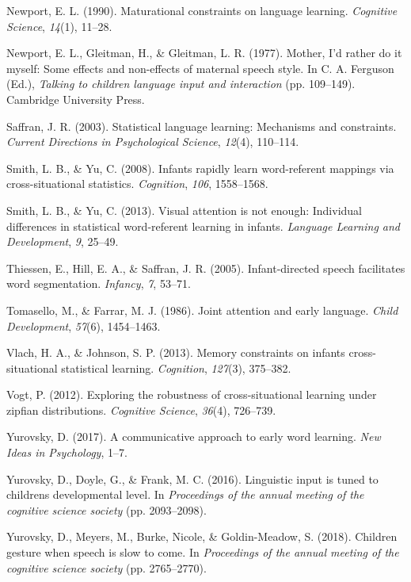 \documentclass[10pt, letterpaper]{article}
\begin{document}
\hypertarget{ref-newport1990}{}
Newport, E. L. (1990). Maturational constraints on language learning.
\emph{Cognitive Science}, \emph{14}(1), 11--28.

\hypertarget{ref-newport1977}{}
Newport, E. L., Gleitman, H., \& Gleitman, L. R. (1977). Mother, I'd
rather do it myself: Some effects and non-effects of maternal speech
style. In C. A. Ferguson (Ed.), \emph{Talking to children language input
and interaction} (pp. 109--149). Cambridge University Press.

\hypertarget{ref-saffran2003}{}
Saffran, J. R. (2003). Statistical language learning: Mechanisms and
constraints. \emph{Current Directions in Psychological Science},
\emph{12}(4), 110--114.

\hypertarget{ref-smith2008}{}
Smith, L. B., \& Yu, C. (2008). Infants rapidly learn word-referent
mappings via cross-situational statistics. \emph{Cognition}, \emph{106},
1558--1568.

\hypertarget{ref-smith2013}{}
Smith, L. B., \& Yu, C. (2013). Visual attention is not enough:
Individual differences in statistical word-referent learning in infants.
\emph{Language Learning and Development}, \emph{9}, 25--49.

\hypertarget{ref-thiessen2005}{}
Thiessen, E., Hill, E. A., \& Saffran, J. R. (2005). Infant-directed
speech facilitates word segmentation. \emph{Infancy}, \emph{7}, 53--71.

\hypertarget{ref-tomasello1986}{}
Tomasello, M., \& Farrar, M. J. (1986). Joint attention and early
language. \emph{Child Development}, \emph{57}(6), 1454--1463.

\hypertarget{ref-vlach2013}{}
Vlach, H. A., \& Johnson, S. P. (2013). Memory constraints on infants
cross-situational statistical learning. \emph{Cognition}, \emph{127}(3),
375--382.

\hypertarget{ref-vogt2012}{}
Vogt, P. (2012). Exploring the robustness of cross-situational learning
under zipfian distributions. \emph{Cognitive Science}, \emph{36}(4),
726--739.

\hypertarget{ref-yurovsky2017}{}
Yurovsky, D. (2017). A communicative approach to early word learning.
\emph{New Ideas in Psychology}, 1--7.

\hypertarget{ref-yurovsky2016}{}
Yurovsky, D., Doyle, G., \& Frank, M. C. (2016). Linguistic input is
tuned to childrens developmental level. In \emph{Proceedings of the
annual meeting of the cognitive science society} (pp. 2093--2098).

\hypertarget{ref-yurovsky2018}{}
Yurovsky, D., Meyers, M., Burke, Nicole, \& Goldin-Meadow, S. (2018).
Children gesture when speech is slow to come. In \emph{Proceedings of
the annual meeting of the cognitive science society} (pp. 2765--2770).


\end{document}
